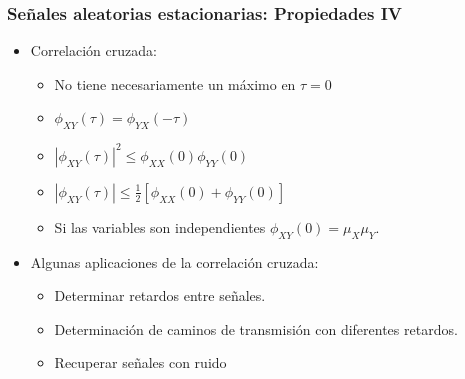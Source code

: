\documentclass{beamer}
\numberwithin{section}{part}
\begin{document}
\begin{frame}
  \frametitle{Señales aleatorias estacionarias: Propiedades IV}
  \footnotesize
    \begin{itemize}
    \item Correlación cruzada:
    \begin{itemize}
      \footnotesize
      \item No tiene necesariamente un máximo en $\tau=0$
      \vspace{0.1cm}
      \item $\phi_{XY}(\tau)=\phi_{YX}(-\tau)$
      \vspace{0.1cm}
      \item  $|\phi_{XY}(\tau)|^2 \le \phi_{XX}(0) \phi_{YY}(0)$
      \vspace{0.1cm}
      \item  $|\phi_{XY}(\tau)| \le \frac{1}{2} [\phi_{XX}(0) +\phi_{YY}(0)]$
      \vspace{0.1cm}
      \item  Si las variables son independientes $\phi_{XY}(0)=\mu_X \mu_Y$.
    \end{itemize}
    \item Algunas aplicaciones de la correlación cruzada:
    \begin{itemize}
      \footnotesize
      \item Determinar retardos entre señales. 
      \item Determinación de caminos de transmisión con diferentes retardos.
      \item Recuperar señales con ruido 
    \end{itemize}
  \end{itemize}
\end{frame}
\end{document}
